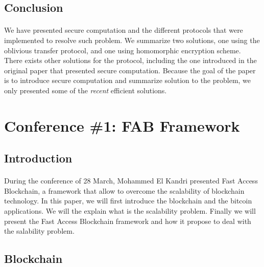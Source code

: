 \documentclass[11pt,a4paper]{article}
\begin{document}
\subsection{Conclusion}

\paragraph{}


We have presented secure computation and the different protocols
that were implemented to resolve such problem. We summarize two solutions,
one using the oblivious transfer protocol, and one using
homomorphic encryption scheme. There exists other solutions for
the protocol, including the one introduced in the original paper
\cite{yao_protocols_1982}
that presented secure computation. Because the goal
of the paper is to introduce secure computation and summarize
solution to the problem, we only presented some of the \textit{recent}
efficient solutions.

\newpage

\section{Conference \#1: FAB Framework}

\subsection{Introduction}

\paragraph{}


During the conference of 28 March, Mohammed El Kandri presented
Fast Access Blockchain, a framework that allow to overcome
the scalability of blockchain technology. In this paper, we
will first introduce the blockchain and the bitcoin applications.
We will the explain what is the scalability problem. Finally
we will present the Fast Access Blockchain framework and how
it propose to deal with the salability problem.

\subsection{Blockchain}

\paragraph{}
\end{document}
